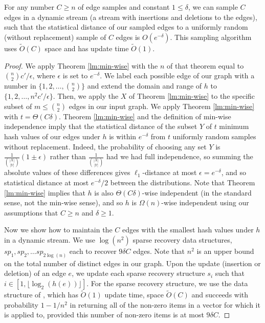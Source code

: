 \begin{lemma}\label{lm:updatetime}
For any number $C \geq n$ of edge samples and constant $1\leq \delta$, we can sample $C$ edges in a dynamic stream (a stream with insertions and deletions to the edges), such that the statistical distance of our sampled edges to a uniformly random (without replacement) sample of $C$ edges is $O(e^{-\delta})$. This sampling algorithm uses $\tilde{O}(C)$ space and has update time $\tilde{O}(1)$.
\end{lemma}
\begin{proof}
We apply Theorem \ref{lm:min-wise} with the $n$ of that theorem equal to ${n \choose 2} c' / \epsilon$, where $\epsilon$ is set to $e^{-\delta}$. We label each possible edge of our graph with a number in $\{1, 2, \ldots, {n \choose 2}\}$ and extend the domain and range of $h$ to $\{1, 2, \ldots, n^2 c' / \epsilon\}$. Then, we apply the $X$ of Theorem \ref{lm:min-wise} to the specific subset of $m \leq {n \choose 2}$ edges in our input graph. We apply Theorem \ref{lm:min-wise}
with $t = \Theta(C \delta)$. Theorem \ref{lm:min-wise} and the definition of min-wise independence imply that the statistical distance of the subset $Y$ of $t$ minimum hash values of our edges under $h$ is within $e^{-\delta}$ from $t$ uniformly random samples without replacement. Indeed, the probability of choosing any set $Y$ is $\frac{1}{{|X| \choose |Y|}} (1 \pm \epsilon)$ rather than $\frac{1}{{|X| \choose |Y|}}$ had we had full independence, so summing the absolute values of these differences gives $\ell_1$-distance at most $\epsilon = e^{-\delta}$, and so statistical distance at most $e^{-\delta}/2$ between the distributions. 
Note that Theorem \ref{lm:min-wise} implies
that $h$ is also $\Theta(C \delta)$-wise independent (in the standard sense, not the min-wise
sense), and so $h$ is $\Omega(n)$-wise independent using our assumptions that $C \geq n$ and
$\delta \geq 1$. 

Now we show how 
to maintain the $C$ edges with the smallest hash values under $h$ in a dynamic stream. 
We use $\log(n^2)$ sparse recovery data structures, $sp_1,sp_2,\dots sp_{2\log(n)}$ each to recover $9\delta C$ edges. Note that $n^2$ is an upper bound on the total number of distinct edges in our graph. Upon the update (insertion or deletion) of an edge $e$, we update each sparse recovery structure $s_i$ such that $i \in [1, \lfloor \log_2(h(e))\rfloor]$. For the sparse recovery structure, we use the data structure of \cite{glps10}, which has $\tilde{O}(1)$ update time, space $\tilde{O}(C)$ and succeeds with probability $1-1/n^2$ in returning all of the non-zero items
in a vector for which it is applied to, provided this number of non-zero items is at most $9\delta C$. 


\end{proof}
